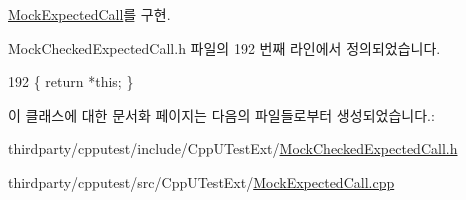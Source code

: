 \hyperlink{class_mock_expected_call_ad8500b86dca8d973cd0ef5089cc9e26c}{Mock\+Expected\+Call}를 구현.



Mock\+Checked\+Expected\+Call.\+h 파일의 192 번째 라인에서 정의되었습니다.


\begin{DoxyCode}
192 \{ \textcolor{keywordflow}{return} *\textcolor{keyword}{this}; \}
\end{DoxyCode}


이 클래스에 대한 문서화 페이지는 다음의 파일들로부터 생성되었습니다.\+:\begin{DoxyCompactItemize}
\item 
thirdparty/cpputest/include/\+Cpp\+U\+Test\+Ext/\hyperlink{_mock_checked_expected_call_8h}{Mock\+Checked\+Expected\+Call.\+h}\item 
thirdparty/cpputest/src/\+Cpp\+U\+Test\+Ext/\hyperlink{_mock_expected_call_8cpp}{Mock\+Expected\+Call.\+cpp}\end{DoxyCompactItemize}
